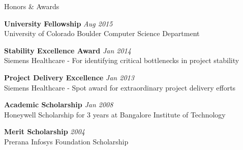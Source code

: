 
\begin{rSection}{Honors \& Awards}

{\bf University Fellowship} \hfill {\em Aug 2015}
\\ University of Colorado Boulder Computer Science Department

{\bf Stability Excellence Award} \hfill {\em Jan 2014}
\\ Siemens Healthcare - For identifying critical bottlenecks in project stability

{\bf Project Delivery Excellence} \hfill {\em Jan 2013}
\\ Siemens Healthcare - Spot award for extraordinary project delivery efforts

{\bf Academic Scholarship} \hfill {\em Jan 2008}
\\ Honeywell Scholarship for 3 years at Bangalore Institute of Technology

{\bf Merit Scholarship} \hfill {\em 2004}
\\ Prerana Infosys Foundation Scholarship

\end{rSection}
